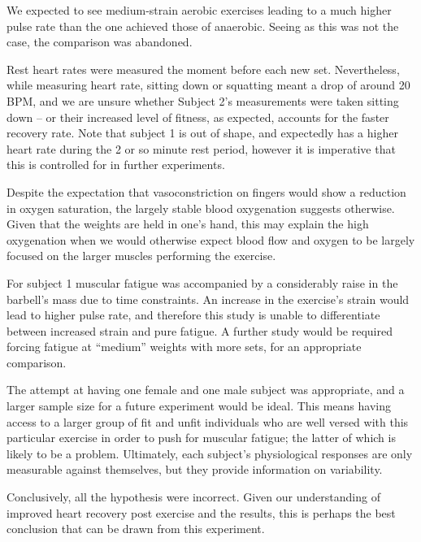 We expected to see medium-strain aerobic exercises leading to a much higher pulse rate than the one achieved those of anaerobic.
Seeing as this was not the case, the comparison was abandoned.

Rest heart rates were measured the moment before each new set.
Nevertheless, while measuring heart rate, sitting down or squatting meant a drop of around 20 BPM, and we are unsure whether Subject 2's measurements were taken sitting down – or their increased level of fitness, as expected, accounts for the faster recovery rate.
Note that subject 1 is out of shape, and expectedly has a higher heart rate during the 2 or so minute rest period, however it is imperative that this is controlled for in further experiments.

Despite the expectation that vasoconstriction on fingers would show a reduction in oxygen saturation, the largely stable blood oxygenation suggests otherwise.
Given that the weights are held in one's hand, this may explain the high oxygenation when we would otherwise expect blood flow and oxygen to be largely focused on the larger muscles performing the exercise.

For subject 1 muscular fatigue was accompanied by a considerably raise in the barbell's mass due to time constraints.
An increase in the exercise's strain would lead to higher pulse rate, and therefore this study is unable to differentiate between increased strain and pure fatigue.
A further study would be required forcing fatigue at ``medium'' weights with more sets, for an appropriate comparison.

The attempt at having one female and one male subject was appropriate, and a larger sample size for a future experiment would be ideal.
This means having access to a larger group of fit and unfit individuals who are well versed with this particular exercise in order to push for muscular fatigue; the latter of which is likely to be a problem.
Ultimately, each subject's physiological responses are only measurable against themselves, but they provide information on variability.

Conclusively, all the hypothesis were incorrect.
Given our understanding of improved heart recovery post exercise and the results, this is perhaps the best conclusion that can be drawn from this experiment.
